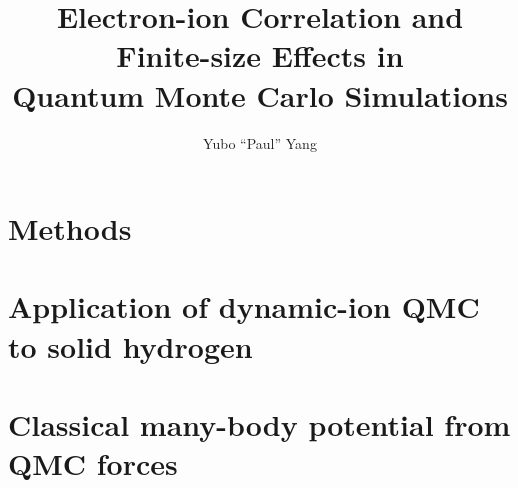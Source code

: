 \documentclass[draftthesis,fullpage]{uiucthesis}
\begin{document}
\title{Electron-ion Correlation and Finite-size Effects in\\
       Quantum Monte Carlo Simulations}
\author{Yubo ``Paul'' Yang}
\phdthesis
{}

%
\tableofcontents
%
\mainmatter



\chapter{Methods}






\chapter{Application of dynamic-ion QMC to solid hydrogen}


\chapter{Classical many-body potential from QMC forces}
\end{document}
